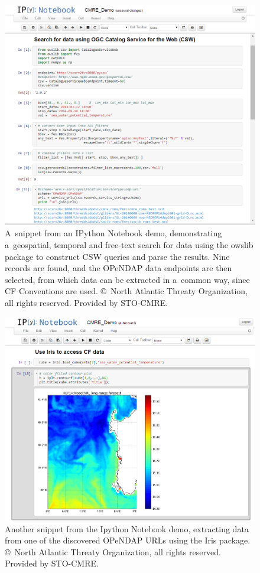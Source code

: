 \documentclass[osd, online, hvmath]{copernicus}
\begin{document}
\begin{figure}
\includegraphics[width=125mm]{os-2015-64-discussions-f05.png}
\caption{A~snippet from an IPython Notebook demo, demonstrating
  a~geospatial, temporal and free-text search for data using the
  owslib package to construct CSW queries and parse the results. Nine
  records are found, and the OPeNDAP data endpoints are then selected,
  from which data can be extracted in a~common way, since CF
  Conventions are used. \copyright~North Atlantic Threaty
  Organization, all rights reserved. Provided by STO-CMRE.}
\label{osd-2015-0064-f05.pdf}
\end{figure}

\begin{figure}
\includegraphics[width=130mm]{os-2015-64-discussions-f06.png}
\caption{Another snippet from the Ipython Notebook demo, extracting
  data from one of the discovered OPeNDAP URLs using the Iris
  package. \copyright~North Atlantic Threaty Organization, all rights reserved. Provided by STO-CMRE.}
\label{osd-2015-0064-f06.pdf}
\end{figure}
\end{document}
